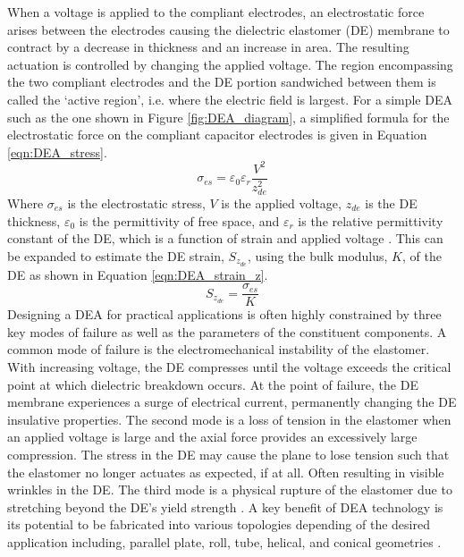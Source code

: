 When a voltage is applied to the compliant electrodes, an electrostatic force arises between the electrodes causing the dielectric elastomer (DE) membrane to contract by a decrease in thickness and an increase in area. The resulting actuation is controlled by changing the applied voltage. The region encompassing the two compliant electrodes and the DE portion sandwiched between them is called the `active region', i.e. where the electric field is largest. For a simple DEA such as the one shown in Figure \ref{fig:DEA_diagram}, a simplified formula for the electrostatic force on the compliant capacitor electrodes is given in Equation \ref{eqn:DEA_stress}.
\begin{equation}
	\sigma_{es} = \varepsilon_0 \varepsilon_r \frac{V^2}{z_{de}^2}
	\label{eqn:DEA_stress}
\end{equation}
Where $\sigma_{es}$ is the electrostatic stress, $V$ is the applied voltage, $z_{de}$ is the DE thickness, $\varepsilon_0$ is the permittivity of free space, and $\varepsilon_r$ is the relative permittivity constant of the DE, which is a function of strain\cite{Kofod2003, Choi2005, Wissler2007} and applied voltage\cite{Rosset2013} . This can be expanded to estimate the DE strain, $S_{z_{de}}$, using the bulk modulus, $K$, of the DE as shown in Equation \ref{eqn:DEA_strain_z}.
\begin{equation}
	S_{z_{de}} = \frac{\sigma_{es}}{K}
	\label{eqn:DEA_strain_z}
\end{equation}
Designing a DEA for practical applications is often highly constrained by three key modes of failure as well as the parameters of the constituent components. A common mode of failure is the electromechanical instability of the elastomer. With increasing voltage, the DE compresses until the voltage exceeds the critical point at which dielectric breakdown occurs. At the point of failure, the DE membrane experiences a surge of electrical current, permanently changing the DE insulative properties. The second mode is a loss of tension in the elastomer when an applied voltage is large and the axial force provides an excessively large compression. The stress in the DE may cause the plane to lose tension such that the elastomer no longer actuates as expected, if at all. Often resulting in visible wrinkles in the DE. The third mode is a physical rupture of the elastomer due to stretching beyond the DE's yield strength \cite{Mao2018} . A key benefit of DEA technology is its potential to be fabricated into various topologies depending of the desired application including, parallel plate\cite{Keplinger2012}, roll\cite{Zhao2018}, tube\cite{Thummala2012}, helical\cite{Kim2018}, and conical geometries\cite{Cao2018} .

